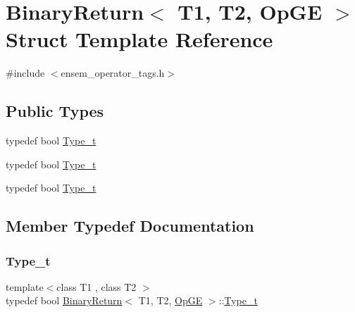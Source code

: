 \hypertarget{structBinaryReturn_3_01T1_00_01T2_00_01OpGE_01_4}{}\section{Binary\+Return$<$ T1, T2, Op\+GE $>$ Struct Template Reference}
\label{structBinaryReturn_3_01T1_00_01T2_00_01OpGE_01_4}


{\ttfamily \#include $<$ensem\+\_\+operator\+\_\+tags.\+h$>$}

\subsection*{Public Types}
\begin{DoxyCompactItemize}
\item 
typedef bool \mbox{\hyperlink{structBinaryReturn_3_01T1_00_01T2_00_01OpGE_01_4_a6bd095ff97c42640d8b1f733b75cf784}{Type\+\_\+t}}
\item 
typedef bool \mbox{\hyperlink{structBinaryReturn_3_01T1_00_01T2_00_01OpGE_01_4_a6bd095ff97c42640d8b1f733b75cf784}{Type\+\_\+t}}
\item 
typedef bool \mbox{\hyperlink{structBinaryReturn_3_01T1_00_01T2_00_01OpGE_01_4_a6bd095ff97c42640d8b1f733b75cf784}{Type\+\_\+t}}
\end{DoxyCompactItemize}


\subsection{Member Typedef Documentation}
\mbox{\label{structBinaryReturn_3_01T1_00_01T2_00_01OpGE_01_4_a6bd095ff97c42640d8b1f733b75cf784}} 
\subsubsection{\texorpdfstring{Type\_t}{Type\_t}\hspace{0.1cm}{\footnotesize\ttfamily [1/3]}}
{\footnotesize\ttfamily template$<$class T1 , class T2 $>$ \\
typedef bool \mbox{\hyperlink{structBinaryReturn}{Binary\+Return}}$<$ T1, T2, \mbox{\hyperlink{structOpGE}{Op\+GE}} $>$\+::\mbox{\hyperlink{structBinaryReturn_3_01T1_00_01T2_00_01OpGE_01_4_a6bd095ff97c42640d8b1f733b75cf784}{Type\+\_\+t}}}

